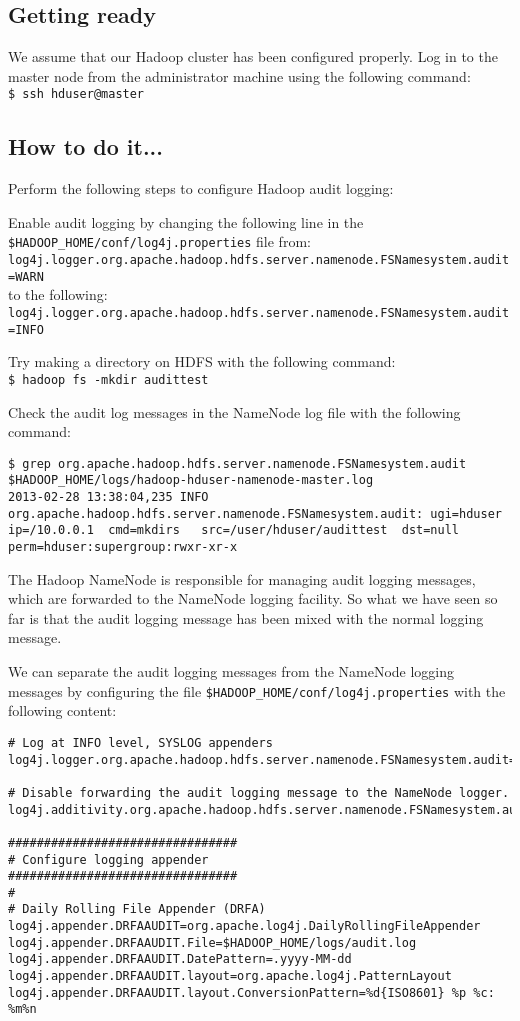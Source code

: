 \subsection*{Getting ready}
We assume that our Hadoop cluster has been configured properly.
Log in to the master node from the administrator machine using the following command:\\ 
\verb|$ ssh hduser@master|

\subsection*{How to do it...}
Perform the following steps to configure Hadoop audit logging: 

Enable audit logging by changing the following line in the \verb|$HADOOP_HOME/conf/log4j.properties| file from: \\
\verb|log4j.logger.org.apache.hadoop.hdfs.server.namenode.FSNamesystem.audit=WARN| \\

to the following: \\
\verb|log4j.logger.org.apache.hadoop.hdfs.server.namenode.FSNamesystem.audit=INFO|

Try making a directory on HDFS with the following command: \\
\verb|$ hadoop fs -mkdir audittest|

Check the audit log messages in the NameNode log file with the following command:
\begin{verbatim}
$ grep org.apache.hadoop.hdfs.server.namenode.FSNamesystem.audit $HADOOP_HOME/logs/hadoop-hduser-namenode-master.log
2013-02-28 13:38:04,235 INFO org.apache.hadoop.hdfs.server.namenode.FSNamesystem.audit: ugi=hduser    ip=/10.0.0.1  cmd=mkdirs   src=/user/hduser/audittest  dst=null        perm=hduser:supergroup:rwxr-xr-x
\end{verbatim}
The Hadoop NameNode is responsible for managing audit logging messages, which are forwarded to the NameNode logging facility. So what we have seen so far is that the audit logging message has been mixed with the normal logging message.

We can separate the audit logging messages from the NameNode logging messages by configuring the file \verb|$HADOOP_HOME/conf/log4j.properties| with the following content: 
\begin{verbatim}
# Log at INFO level, SYSLOG appenders
log4j.logger.org.apache.hadoop.hdfs.server.namenode.FSNamesystem.audit=INFO

# Disable forwarding the audit logging message to the NameNode logger.
log4j.additivity.org.apache.hadoop.hdfs.server.namenode.FSNamesystem.audit=false

################################
# Configure logging appender
################################
#
# Daily Rolling File Appender (DRFA)
log4j.appender.DRFAAUDIT=org.apache.log4j.DailyRollingFileAppender
log4j.appender.DRFAAUDIT.File=$HADOOP_HOME/logs/audit.log
log4j.appender.DRFAAUDIT.DatePattern=.yyyy-MM-dd
log4j.appender.DRFAAUDIT.layout=org.apache.log4j.PatternLayout
log4j.appender.DRFAAUDIT.layout.ConversionPattern=%d{ISO8601} %p %c: %m%n
\end{verbatim}

